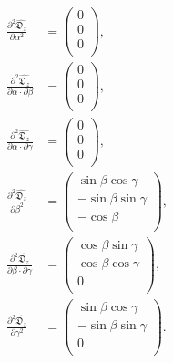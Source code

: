 \documentclass[a4paper,11pt,twoside,openright]{book}
\def\lthtmlcheckvsize{\ifdim\ht\sizebox<\vsize 
  \ifdim\wd\sizebox<\hsize\expandafter\hfill\fi \expandafter\vfill
  \else\expandafter\vss\fi}%
\begin{document}
{\newpage\clearpage
\setcounter{equation}{179}
%
\begin{subequations}\begin{align}
\frac{\partial^2 \widehat{\mathfrak{D}_z}}{\partial \alpha^2} &= \begin{pmatrix}
0 \\
0 \\
0 \\
\end{pmatrix}, \\
\frac{\partial^2 \widehat{\mathfrak{D}_z}}{\partial \alpha \cdot \partial \beta} &= \begin{pmatrix}
0 \\
0 \\
0 \\
\end{pmatrix}, \\
\frac{\partial^2 \widehat{\mathfrak{D}_z}}{\partial \alpha \cdot \partial \gamma} &= \begin{pmatrix}
0 \\
0 \\
0 \\
\end{pmatrix}, \\
\frac{\partial^2 \widehat{\mathfrak{D}_z}}{\partial \beta^2} &= \begin{pmatrix}
\sin \beta \cos \gamma \\
-\sin \beta \sin \gamma \\
-\cos \beta \\
\end{pmatrix}, \\
\frac{\partial^2 \widehat{\mathfrak{D}_z}}{\partial \beta \cdot \partial \gamma} &= \begin{pmatrix}
\cos \beta \sin \gamma \\
\cos \beta \cos \gamma \\
0 \\
\end{pmatrix}, \\
\frac{\partial^2 \widehat{\mathfrak{D}_z}}{\partial \gamma^2} &= \begin{pmatrix}
\sin \beta \cos \gamma \\
-\sin \beta \sin \gamma \\
0 \\
\end{pmatrix}.
\end{align}\end{subequations}%
\lthtmldisplayZ
\lthtmlcheckvsize\clearpage}
\end{document}
